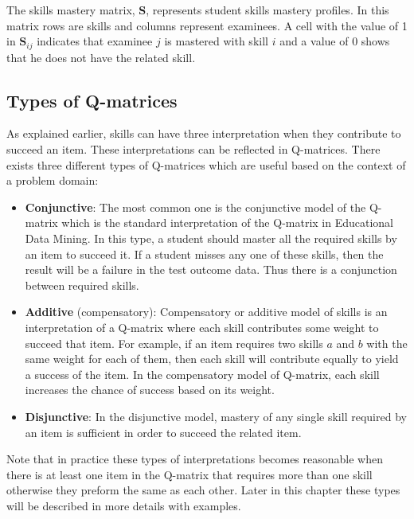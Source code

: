 The skills mastery matrix, \textbf{S}, represents student skills mastery profiles. In this matrix rows are skills and columns represent examinees. A cell with the value of 1 in $\mathbf{S}_{ij}$ indicates that examinee $j$ is mastered with skill $i$ and a value of 0 shows that he does not have the related skill.



\subsection{Types of Q-matrices}
 
As explained earlier, skills can have three interpretation when they contribute to succeed an item. These interpretations can be reflected in Q-matrices. There exists three different types of Q-matrices which are useful based on the context of a problem domain:

\begin{itemize}
\item \textbf{Conjunctive}: The most common one is the conjunctive model of the Q-matrix which is the standard interpretation of the Q-matrix in Educational Data Mining. In this type, a student should master all the required skills by an item to succeed it. If a student misses any one of these skills, then the result will be a failure in the test outcome data. Thus there is a conjunction between required skills.

\item \textbf{Additive} (compensatory): Compensatory or additive model of skills is an interpretation of a Q-matrix where each skill contributes some weight to succeed that item. For example, if an item requires two skills $a$ and $b$ with the same weight for each of them, then each skill will contribute equally to yield a success of the item. In the compensatory model of Q-matrix, each skill increases the chance of success based on its weight.

\item \textbf{Disjunctive}: In the disjunctive model, mastery of any single skill required by an item is sufficient in order to succeed the related item.
\end{itemize}

Note that in practice these types of interpretations becomes reasonable when there is at least one item in the Q-matrix that requires more than one skill otherwise they preform the same as each other. Later in this chapter these types will be described in more details with examples.


